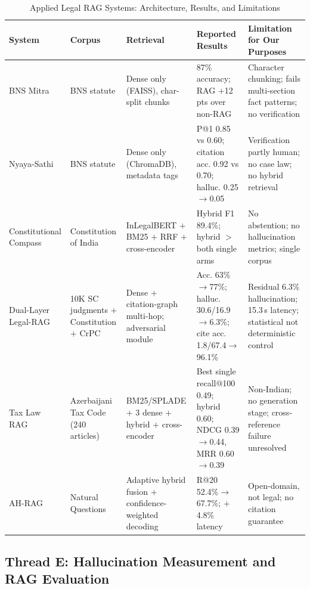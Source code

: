 \documentclass[conference]{IEEEtran}
\begin{document}
\begin{table}[t]
\caption{Applied Legal RAG Systems: Architecture, Results, and Limitations}
\label{tab:applied}
\centering
\footnotesize
\begin{tabular}{@{}p{2.0cm}p{2.1cm}p{3.0cm}p{4.0cm}p{4.5cm}@{}}
\toprule
\textbf{System} & \textbf{Corpus} & \textbf{Retrieval} & \textbf{Reported Results} & \textbf{Limitation for Our Purposes} \\
\midrule
BNS Mitra \cite{patil2025} & BNS statute & Dense only (FAISS), char-split chunks & 87\% accuracy; RAG $+$12 pts over non-RAG & Character chunking; fails multi-section fact patterns; no verification \\
\addlinespace
Nyaya-Sathi \cite{dixit2025} & BNS statute & Dense only (ChromaDB), metadata tags & P@1 0.85 vs 0.60; citation acc. 0.92 vs 0.70; halluc. 0.25$\rightarrow$0.05 & Verification partly human; no case law; no hybrid retrieval \\
\addlinespace
Constitutional Compass \cite{bolla2026} & Constitution of India & InLegalBERT $+$ BM25 $+$ RRF $+$ cross-encoder & Hybrid F1 89.4\%; hybrid $>$ both single arms & No abstention; no hallucination metrics; single corpus \\
\addlinespace
Dual-Layer Legal-RAG \cite{bindra2026} & 10K SC judgments $+$ Constitution $+$ CrPC & Dense $+$ citation-graph multi-hop; adversarial module & Acc. 63\%$\rightarrow$77\%; halluc. 30.6/16.9$\rightarrow$6.3\%; cite acc. 1.8/67.4$\rightarrow$96.1\% & Residual 6.3\% hallucination; 15.3\,s latency; statistical not deterministic control \\
\addlinespace
Tax Law RAG \cite{rustamov2025} & Azerbaijani Tax Code (240 articles) & BM25/SPLADE $+$ 3 dense $+$ hybrid $+$ cross-encoder & Best single recall@100 0.49; hybrid 0.60; NDCG 0.39$\rightarrow$0.44, MRR 0.60$\rightarrow$0.39 & Non-Indian; no generation stage; cross-reference failure unresolved \\
\addlinespace
AH-RAG \cite{sun2025} & Natural Questions & Adaptive hybrid fusion $+$ confidence-weighted decoding & R@20 52.4\%$\rightarrow$67.7\%; $+$4.8\% latency & Open-domain, not legal; no citation guarantee \\
\bottomrule
\end{tabular}
\end{table}

\subsection{Thread E: Hallucination Measurement and RAG Evaluation}
\end{document}
